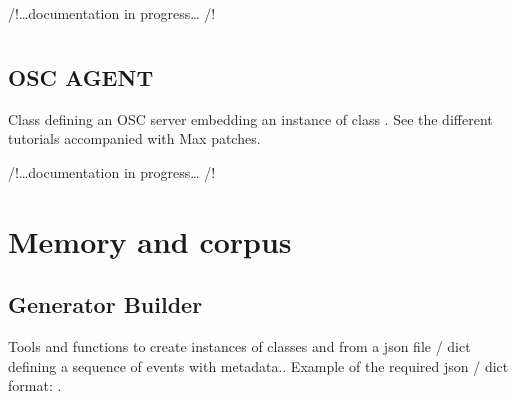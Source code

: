 \documentclass[letterpaper,10pt,english]{sphinxmanual}
\begin{document}
/!…documentation in progress… /!


\chapter{}
\label{\detokenize{index:osc-communication}}\label{\detokenize{index:module-OSCAgent}}

\section{OSC AGENT}
\label{\detokenize{index:osc-agent}}
Class defining an OSC server embedding an instance of class {\hyperref[\detokenize{index:Generator.GenerationHandler}]{}}.
See the different tutorials accompanied with Max patches.

/!…documentation in progress… /!


\chapter{Memory and corpus}
\label{\detokenize{index:memory-and-corpus}}\label{\detokenize{index:module-GeneratorBuilder}}

\section{Generator Builder}
\label{\detokenize{index:generator-builder}}
Tools and functions to create instances of classes {\hyperref[\detokenize{index:Generator.Generator}]{}} and {\hyperref[\detokenize{index:Generator.GenerationHandler}]{}} from a json file / dict defining a sequence of events with metadata..
Example of the required json / dict format: .
\end{document}

